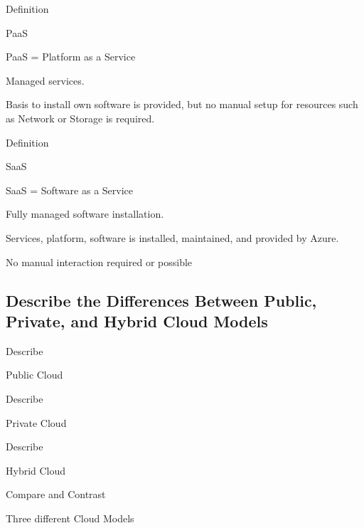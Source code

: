 \documentclass{scrartcl}
\newenvironment{flashcard}[2][]{%
    #1
    \vfill
    \centerline{\Large{#2}}
    \vfill
    \newpage
}
{\newpage}
\newcommand{\subsectioncard}[1]{
    \vspace*{\stretch{1}}
    \subsection{#1}
    \vspace*{\stretch{1}}
    \pagebreak
}
\begin{document}
    \begin{flashcard}[Definition]{PaaS}
        PaaS = Platform as a Service

        Managed services.

        Basis to install own software is provided, but no manual setup for
        resources such as Network or Storage is required.
    \end{flashcard}

    \begin{flashcard}[Definition]{SaaS}
        SaaS = Software as a Service

        Fully managed software installation.

        Services, platform, software is installed, maintained, and provided by Azure.

        No manual interaction required or possible
    \end{flashcard}

    \subsectioncard{Describe the Differences Between Public, Private, and Hybrid Cloud Models}

    \begin{flashcard}[Describe]{Public Cloud}

    \end{flashcard}

    \begin{flashcard}[Describe]{Private Cloud}

    \end{flashcard}

    \begin{flashcard}[Describe]{Hybrid Cloud}

    \end{flashcard}

    \begin{flashcard}[Compare and Contrast]{Three different Cloud Models}

    \end{flashcard}
\end{document}
